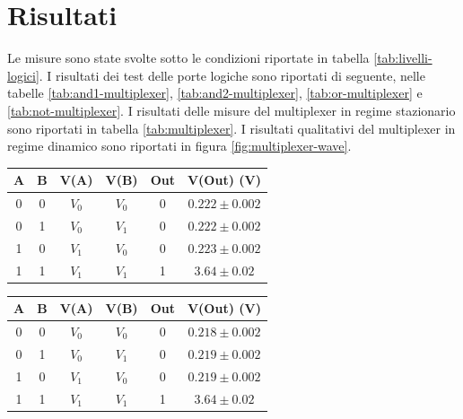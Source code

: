 \section{Risultati}\label{sec:risultati}
Le misure sono state svolte sotto le condizioni riportate in tabella \ref{tab:livelli-logici}.
I risultati dei test delle porte logiche sono riportati di seguente, nelle tabelle \ref{tab:and1-multiplexer}, \ref{tab:and2-multiplexer}, \ref{tab:or-multiplexer} e \ref{tab:not-multiplexer}.
I risultati delle misure del multiplexer in regime stazionario sono riportati in tabella \ref{tab:multiplexer}.
I risultati qualitativi del multiplexer in regime dinamico sono riportati in figura \ref{fig:multiplexer-wave}.


\begin{table}[H]
  \centering
  \begin{subtable}[H]{0.5\textwidth}
    \centering
    \begin{tabular}[t]{c  c | c  c | c  c}
      \hline
      A & B & V(A) & V(B) & Out & V(Out) (V)\\
      \hline
      0 & 0 & $V_{0}$ & $V_{0}$ & 0 & $0.222 \pm 0.002$ \\
      0 & 1 & $V_{0}$ & $V_{1}$ & 0 & $0.222 \pm 0.002$ \\
      1 & 0 & $V_{1}$ & $V_{0}$ & 0 & $0.223 \pm 0.002$ \\
      1 & 1 & $V_{1}$ & $V_{1}$ & 1 & $3.64 \pm 0.02$ \\
      \hline
    \end{tabular}
  \end{subtable}

  \vspace{.5cm}

  \begin{subtable}[H]{0.5\textwidth}
    \centering
    \begin{tabular}[t]{c  c | c  c | c  c}
      \hline
      A & B & V(A) & V(B) & Out & V(Out) (V)\\
      \hline
      0 & 0 & $V_{0}$ & $V_{0}$ & 0 & $0.218 \pm 0.002$ \\
      0 & 1 & $V_{0}$ & $V_{1}$ & 0 & $0.219 \pm 0.002$ \\
      1 & 0 & $V_{1}$ & $V_{0}$ & 0 & $0.219 \pm 0.002$ \\
      1 & 1 & $V_{1}$ & $V_{1}$ & 1 & $3.64 \pm 0.02$ \\
      \hline
    \end{tabular}
  \end{subtable}


\end{table}

